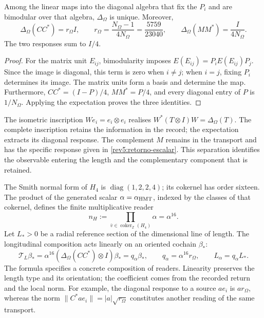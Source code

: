 \begin{proposition}
\label{rev5:retorno}
Among the linear maps into the diagonal algebra that fix
the \(P_i\) and are bimodular over that algebra,
\(\Delta_\Omega\) is unique. Moreover,
\begin{equation}
 \Delta_\Omega(CC^*)=r_\Omega I,
 \qquad r_\Omega=\frac{N_\Omega-1}{4N_\Omega}
 =\frac{5759}{23040},
 \qquad \Delta_\Omega(MM^*)=\frac{I}{4N_\Omega}.
 \label{rev5:retorno-escalar}
\end{equation}
The two responses sum to \(I/4\).
\end{proposition}
\begin{proof}
For the matrix unit \(E_{ij}\), bimodularity imposes
\(E(E_{ij})=P_iE(E_{ij})P_j\). Since the image is diagonal,
this term is zero when \(i\ne j\); when \(i=j\), fixing
\(P_i\) determines its image. The matrix units form a basis
and determine the map. Furthermore,
\(CC^*=(I-P)/4\), \(MM^*=P/4\), and every diagonal entry
of \(P\) is \(1/N_\Omega\). Applying the expectation proves
the three identities.
\end{proof}

The isometric inscription \(We_i=e_i\otimes e_i\) realises
\(W^*(T\otimes I)W=\Delta_\Omega(T)\). The complete inscription
retains the information in the record; the expectation extracts
its diagonal response. The complement \(M\) remains in the
transport and has the specific response given in
\eqref{rev5:retorno-escalar}. This separation identifies the observable
entering the length and the complementary component that is retained.

The Smith normal form of \(H_4\) is
\(\operatorname{diag}(1,2,2,4)\); its cokernel has order
sixteen. The product of the generated scalar
\(\alpha=\alpha_{\rm HMT}\), indexed by the classes of that
cokernel, defines the finite multiplicative reader
\[
 n_H:=\prod_{\bar v\in\operatorname{coker}_{\mathbb Z}(H_4)}
 \alpha=\alpha^{16}.
\]
Let \(L_*>0\) be a radial reference
section of the dimensional line of length. The longitudinal composition
acts linearly on an oriented cochain \(\beta_*\):
\begin{equation}
 \mathscr T_L\beta_*
 =\alpha^{16}(\Delta_\Omega(CC^*)\otimes I)\beta_*
 =q_\alpha\beta_*,\qquad
 q_\alpha=\alpha^{16}r_\Omega,\qquad
 L_\alpha=q_\alpha L_*.
 \label{rev5:longitud-generada}
\end{equation}
The formula specifies a concrete composition of readers. Linearity
preserves the length type and its orientation; the coefficient comes
from the recorded return and the local norm. For example, the diagonal
response to a source \(a e_i\) is \(a r_\Omega\), whereas
the norm \(\|C^*ae_i\|=|a|\sqrt{r_\Omega}\) constitutes
another reading of the same transport.

